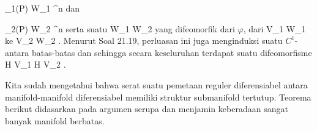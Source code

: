 {\mavergleichskette
{\vergleichskette
{ \alpha_1(P)
}
{ \in }{ W_1
}
{ \subseteq }{ \R^n
}
{    }{
}
{   }{
}
}
{}{}{}
dan

\mavergleichskette
{\vergleichskette
{ \alpha_2(P)
}
{ \in }{ W_2
}
{ \subseteq }{ \R^n
}
{    }{
}
{   }{
}
}
{}{}{}
serta suatu
\maabbdisp {\tilde{\varphi}} { W_1 } { W_2
} {}
yang difeomorfik dari $\varphi$, dari
\mathkor {} {V_1 \cap W_1} {ke} {V_2 \cap W_2} {.}
Menurut Soal 21.19, perluasan ini juga menginduksi suatu
$C^1$-
antara batas-batas
 dan
 sehingga secara keseluruhan terdapat suatu difeomorfisme
 { \partial H \cap V_1 } { \partial H \cap V_2
} {.}

}

Kita sudah mengetahui bahwa serat suatu pemetaan reguler diferensiabel antara manifold-manifold diferensiabel memiliki struktur submanifold tertutup. Teorema berikut didasarkan pada argumen serupa dan menjamin keberadaan sangat banyak manifold berbatas.


